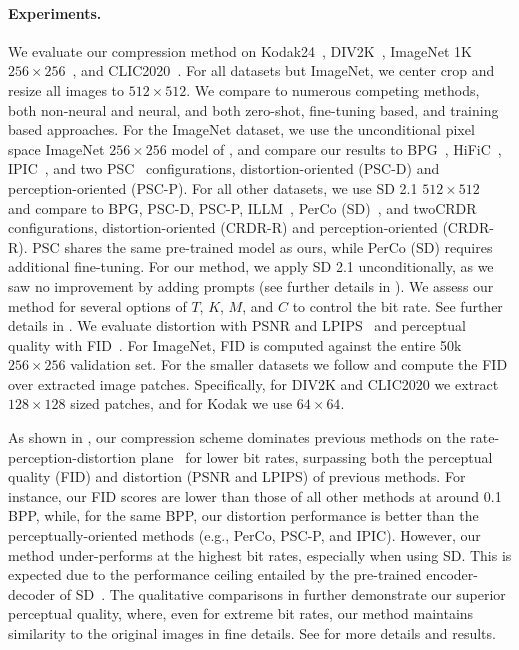 \paragraph{Experiments.}
We evaluate our compression method on Kodak24~\cite{franzen1999kodak}, DIV2K~\citep{agustsson2017ntire}, ImageNet 1K $256\times 256$~\citep{deng2009imagenet,pan2020dgp}, and CLIC2020~\citep{CLIC2020}.
For all datasets but ImageNet, we center crop and resize all images to $512\times512$.
We compare to numerous competing methods, both non-neural and neural, and both zero-shot, fine-tuning based, and training based approaches.
For the ImageNet dataset, we use the unconditional pixel space ImageNet $256\times 256$ model of \citet{dhariwal2021diffusion}, and compare our results to BPG~\citep{bpg}, HiFiC~\citep{mentzer2020high}, IPIC~\citep{xu2024idempotence}, and two  PSC~\citep{elata2024zero} configurations, distortion-oriented (PSC-D) and perception-oriented (PSC-P).
For all other datasets, we use SD 2.1 $512\times512$~\citep{rombach2022high} and compare to BPG, PSC-D, PSC-P, ILLM~\citep{muckley2023improving}, PerCo (SD)~\citep{korber2024perco, careil2023towards}, and twoCRDR~\citep{iwai2024controlling} configurations, distortion-oriented (CRDR-R) and perception-oriented (CRDR-R).
PSC shares the same pre-trained model as ours, while PerCo (SD) requires additional fine-tuning.
For our method, we apply SD 2.1 unconditionally, as we saw no improvement by adding prompts (see further details in ).
We assess our method for several options of $T$, $K$, $M$, and $C$ to control the bit rate.
See further details in .
We evaluate distortion with PSNR and LPIPS~\citep{zhang2018perceptual} and perceptual quality with FID~\citep{bińkowski2018demystifying}.
For ImageNet, FID is computed against the entire 50k $256\times 256$ validation set.
For the smaller datasets we follow \citet{mentzer2020high} and compute the FID over extracted image patches. 
Specifically, for DIV2K and CLIC2020 we extract $128\times 128$ sized patches, and for Kodak we use $64\times64$.


As shown in , our compression scheme dominates previous methods on the rate-perception-distortion plane~\citep{pmlr-v97-blau19a} for lower bit rates, surpassing both the perceptual quality (FID) and distortion (PSNR and LPIPS) of previous methods.
For instance, our FID scores are lower than those of all other methods at around 0.1 BPP, while, for the same BPP, our distortion performance is better than the perceptually-oriented methods (e.g., PerCo, PSC-P, and IPIC).
However, our method under-performs at the highest bit rates, especially when using SD. This is expected due to the performance ceiling entailed by the pre-trained encoder-decoder of SD~\citep{korber2024perco, elata2024zero}.
The qualitative comparisons in  further demonstrate our superior perceptual quality, where, even for extreme bit rates, our method maintains similarity to the original images in fine details.
See  for more details and results.


